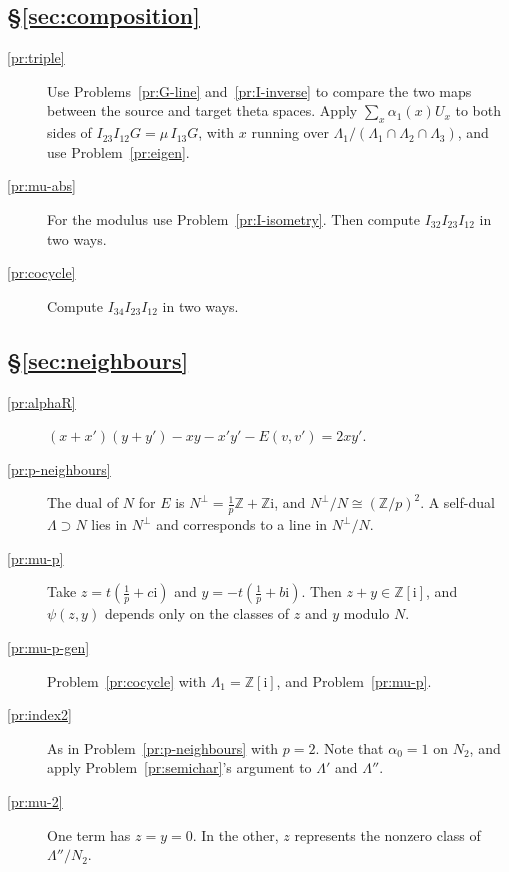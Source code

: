 \documentclass[reqno]{amsart}
\theoremstyle{definition}
\theoremstyle{plain}
\newcommand{\Z}{\mathbb{Z}}
\newcommand{\ii}{\mathrm{i}}
\begin{document}
\subsection*{\S\ref{sec:composition}}
\begin{description}
\item[\ref{pr:triple}] Use Problems~\ref{pr:G-line} and~\ref{pr:I-inverse} to compare the two maps between the source and target theta spaces.  Apply \(\sum_{x} \alpha_1(x)U_x\) to both sides of \(I_{23}I_{12}G = \mu\, I_{13}G\), with \(x\) running over \(\Lambda_1/(\Lambda_1 \cap \Lambda_2 \cap \Lambda_3)\), and use Problem~\ref{pr:eigen}.
\item[\ref{pr:mu-abs}] For the modulus use Problem~\ref{pr:I-isometry}.  Then compute \(I_{32}I_{23}I_{12}\) in two ways.
\item[\ref{pr:cocycle}] Compute \(I_{34}I_{23}I_{12}\) in two ways.
\end{description}

\subsection*{\S\ref{sec:neighbours}}
\begin{description}
\item[\ref{pr:alphaR}] \((x+x')(y+y') - xy - x'y' - E(v,v') = 2xy'\).
\item[\ref{pr:p-neighbours}] The dual of \(N\) for \(E\) is \(N^\perp = \frac1p\Z + \Z\ii\), and \(N^\perp/N \cong (\Z/p)^2\).  A self-dual \(\Lambda \supset N\) lies in \(N^\perp\) and corresponds to a line in \(N^\perp/N\).
\item[\ref{pr:mu-p}] Take \(z = t(\frac1p + c\ii)\) and \(y = -t(\frac1p + b\ii)\).  Then \(z + y \in \Z[\ii]\), and \(\psi(z,y)\) depends only on the classes of \(z\) and \(y\) modulo \(N\).
\item[\ref{pr:mu-p-gen}] Problem~\ref{pr:cocycle} with \(\Lambda_1 = \Z[\ii]\), and Problem~\ref{pr:mu-p}.
\item[\ref{pr:index2}] As in Problem~\ref{pr:p-neighbours} with \(p = 2\).  Note that \(\alpha_0 = 1\) on \(N_2\), and apply Problem~\ref{pr:semichar}'s argument to \(\Lambda'\) and \(\Lambda''\).
\item[\ref{pr:mu-2}] One term has \(z = y = 0\).  In the other, \(z\) represents the nonzero class of \(\Lambda''/N_2\).
\end{description}
\end{document}
